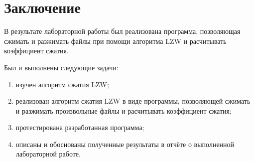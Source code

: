 \chapter*{Заключение}

В результате лабораторной работы был реализована программа, позволяющая сжимать и разжимать файлы при помощи алгоритма LZW и расчитывать коэффициент сжатия.

Был и выполнены следующие задачи:
\begin{enumerate}[label=\arabic*)]
	\item изучен алгоритм сжатия LZW;
    \item реализован алгоритм сжатия LZW в виде программы, позволяющей сжимать и разжимать произвольные файлы и расчитывать коэффициент сжатия;
	\item протестирована разработанная программа;
	\item описаны и обоснованы полученные результаты в отчёте о выполненной лабораторной работе.
\end{enumerate}
